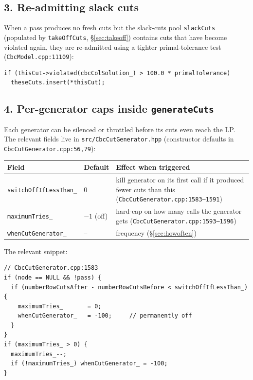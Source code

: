 \documentclass[11pt,a4paper]{article}
\begin{document}
\subsection*{3. Re-admitting slack cuts}

When a pass produces no fresh cuts but the slack-cuts pool
\texttt{slackCuts} (populated by \texttt{takeOffCuts}, \S\ref{sec:takeoff})
contains cuts that have become violated again, they are re-admitted
using a tighter primal-tolerance test (\texttt{CbcModel.cpp:11109}):

\begin{lstlisting}
if (thisCut->violated(cbcColSolution_) > 100.0 * primalTolerance)
  theseCuts.insert(*thisCut);
\end{lstlisting}

\subsection*{4. Per-generator caps inside \texttt{generateCuts}}

Each generator can be silenced or throttled before its cuts even
reach the LP.  The relevant fields live in
\texttt{src/CbcCutGenerator.hpp} (constructor defaults in
\texttt{CbcCutGenerator.cpp:56,79}):

\begin{tabular}{lll}
\toprule
Field & Default & Effect when triggered\\
\midrule
\texttt{switchOffIfLessThan\_} & $0$ & kill generator on its first
                                       call if it produced fewer
                                       cuts than this
                                       (\texttt{CbcCutGenerator.cpp:1583--1591})\\
\texttt{maximumTries\_}        & $-1$ (off) & hard-cap on how many
                                       calls the generator gets
                                       (\texttt{CbcCutGenerator.cpp:1593--1596})\\
\texttt{whenCutGenerator\_}    & --   & frequency (\S\ref{sec:howoften})\\
\bottomrule
\end{tabular}

The relevant snippet:

\begin{lstlisting}
// CbcCutGenerator.cpp:1583
if (node == NULL && !pass) {
  if (numberRowCutsAfter - numberRowCutsBefore < switchOffIfLessThan_) {
    maximumTries_       = 0;
    whenCutGenerator_   = -100;     // permanently off
  }
}
if (maximumTries_ > 0) {
  maximumTries_--;
  if (!maximumTries_) whenCutGenerator_ = -100;
}
\end{lstlisting}
\end{document}

